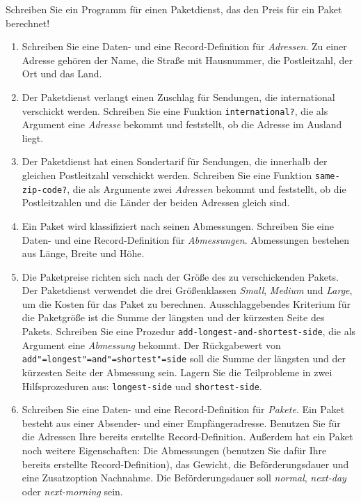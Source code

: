 \begin{aufgabe}

  Schreiben Sie ein Programm für einen Paketdienst, das den Preis
  für ein Paket berechnet!
  \begin{enumerate}
    
  \item Schreiben Sie eine Daten- und eine Record-Definition für
    \textit{Adressen}.  Zu einer Adresse gehören der Name, die Straße
    mit Hausnummer, die Postleitzahl, der Ort und das Land.
    
  \item Der Paketdienst verlangt einen Zuschlag für Sendungen, die
    international verschickt werden.  Schreiben Sie eine Funktion
    \texttt{international?}, die als Argument eine \textit{Adresse}
    bekommt und feststellt, ob die Adresse im Ausland liegt.

  \item Der Paketdienst hat einen Sondertarif für Sendungen, die
    innerhalb der gleichen Postleitzahl verschickt werden.  Schreiben
    Sie eine Funktion \texttt{same-zip-code?}, die als Argumente zwei
    \textit{Adressen} bekommt und feststellt, ob die Postleitzahlen
    und die Länder der beiden Adressen gleich sind.

  \item Ein Paket wird klassifiziert nach seinen Abmessungen.
    Schreiben Sie eine Daten- und eine Record-Definition für
    \textit{Abmessungen}.  Abmessungen bestehen aus Länge, Breite und
    Höhe.

  \item Die Paketpreise richten sich nach der Größe des zu
    verschickenden Pakets.  Der Paketdienst verwendet die drei
    Größenklassen \textit{Small}, \textit{Medium} und \textit{Large},
    um die Kosten für das Paket zu berechnen.  Ausschlaggebendes
    Kriterium für die Paketgröße ist die Summe der längsten und der
    kürzesten Seite des Pakets.  Schreiben Sie eine Prozedur
    \texttt{add-longest-and-shortest-side}, die als Argument eine
    \textit{Abmessung} bekommt.  Der Rückgabewert von
    \texttt{add"=longest"=and"=shortest"=side} soll die Summe der längsten
    und der kürzesten Seite der Abmessung sein.  Lagern Sie die
    Teilprobleme in zwei Hilfsprozeduren aus: \texttt{longest-side}
    und \texttt{shortest-side}.

  \item Schreiben Sie eine Daten- und eine Record-Definition für
    \textit{Pakete}.  Ein Paket besteht aus einer Absender- und einer
    Empfängeradresse.  Benutzen Sie für die Adressen Ihre bereits
    erstellte Record-Definition.  Außerdem hat ein Paket noch weitere
    Eigenschaften: Die Abmessungen (benutzen Sie dafür Ihre bereits
    erstellte Record-Definition), das Gewicht, die Beförderungsdauer
    und eine Zusatz\-option Nachnahme.  Die Beförderungsdauer soll
    \emph{normal}, \emph{next-day} oder \emph{next-morning} sein.


\end{enumerate}
\end{aufgabe}
